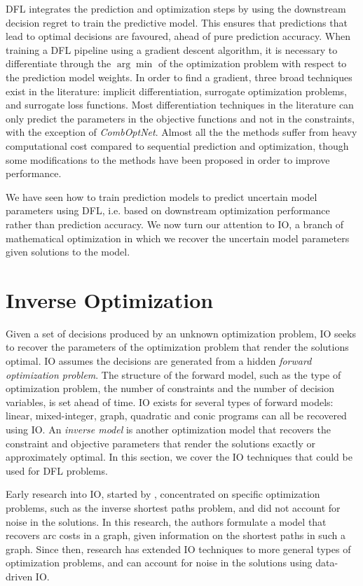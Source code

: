 DFL integrates the prediction and optimization steps by using the downstream decision regret to train the predictive model. This ensures that predictions that lead to optimal decisions are favoured, ahead of pure prediction accuracy. When training a DFL pipeline using a gradient descent algorithm, it is necessary to differentiate through the $\arg\min$ of the optimization problem with respect to the prediction model weights. In order to find a gradient, three broad techniques exist in the literature: implicit differentiation, surrogate optimization problems, and surrogate loss functions. Most differentiation techniques in the literature can only predict the parameters in the objective functions and not in the constraints, with the exception of \textit{CombOptNet}. Almost all the the methods suffer from heavy computational cost compared to sequential prediction and optimization, though some modifications to the methods have been proposed in order to improve performance. 

We have seen how to train prediction models to predict uncertain model parameters using DFL, i.e. based on downstream optimization performance rather than prediction accuracy. We now turn our attention to IO, a branch of mathematical optimization in which we recover the uncertain model parameters given solutions to the model.

\section{Inverse Optimization} \label{sec:litrev:inverse-optimization}

Given a set of decisions produced by an unknown optimization problem, IO seeks to recover the parameters of the optimization problem that render the solutions optimal. IO assumes the decisions are generated from a hidden \textit{forward optimization problem}. The structure of the forward model, such as the type of optimization problem, the number of constraints and the number of decision variables, is set ahead of time. IO exists for several types of forward models: linear, mixed-integer, graph, quadratic and conic programs can all be recovered using IO. An \textit{inverse model} is another optimization model that recovers the constraint and objective parameters that render the solutions exactly or approximately optimal. In this section, we cover the IO techniques that could be used for DFL problems.

Early research into IO, started by \cite{burtonInstanceInverseShortest1992}, concentrated on specific optimization problems, such as the inverse shortest paths problem, and did not account for noise in the solutions. In this research, the authors formulate a model that recovers arc costs in a graph, given information on the shortest paths in such a graph. Since then, research has extended IO techniques to more general types of optimization problems, and can account for noise in the solutions using data-driven IO.

